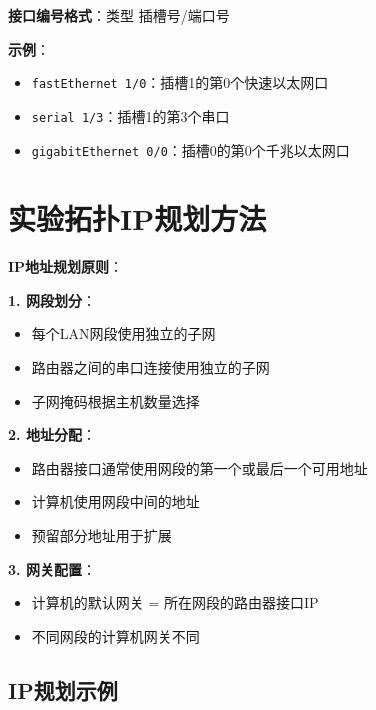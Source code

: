 \documentclass[12pt,a4paper]{ctexart}
\begin{document}
\begin{keybox}
\textbf{接口编号格式}：类型 插槽号/端口号

\textbf{示例}：
\begin{itemize}[itemsep=0pt]
    \item \texttt{fastEthernet 1/0}：插槽1的第0个快速以太网口
    \item \texttt{serial 1/3}：插槽1的第3个串口
    \item \texttt{gigabitEthernet 0/0}：插槽0的第0个千兆以太网口
\end{itemize}
\end{keybox}

\section{实验拓扑IP规划方法}

\begin{keybox}
\textbf{IP地址规划原则}：

\textbf{1. 网段划分}：
\begin{itemize}[itemsep=0pt]
    \item 每个LAN网段使用独立的子网
    \item 路由器之间的串口连接使用独立的子网
    \item 子网掩码根据主机数量选择
\end{itemize}

\textbf{2. 地址分配}：
\begin{itemize}[itemsep=0pt]
    \item 路由器接口通常使用网段的第一个或最后一个可用地址
    \item 计算机使用网段中间的地址
    \item 预留部分地址用于扩展
\end{itemize}

\textbf{3. 网关配置}：
\begin{itemize}[itemsep=0pt]
    \item 计算机的默认网关 = 所在网段的路由器接口IP
    \item 不同网段的计算机网关不同
\end{itemize}
\end{keybox}

\subsection{IP规划示例}
\end{document}
